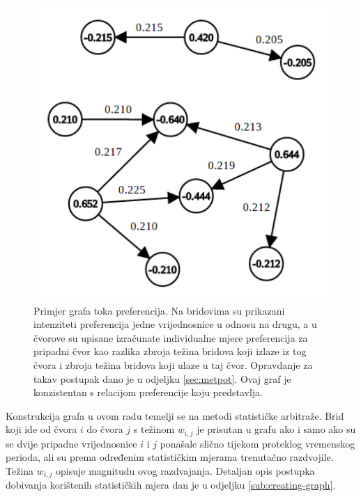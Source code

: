 \documentclass[lmodern, utf8, diplomski, numeric]{fer}
\begin{document}
  \begin{figure}[h]
    \centering
    \includegraphics[width=0.65\columnwidth]{graphics/graph.pdf}
    \caption{Primjer grafa toka preferencija. Na bridovima su prikazani intenziteti preferencija jedne vrijednosnice u odnosu na drugu, a u čvorove su upisane izračunate individualne mjere preferencija za pripadni čvor kao razlika zbroja težina bridova koji izlaze iz tog čvora i zbroja težina bridova koji ulaze u taj čvor. Opravdanje za takav postupak dano je u odjeljku \ref{sec:metpot}. Ovaj graf je konzistentan s relacijom preferencije koju predstavlja.}
    \label{fig:graph}
  \end{figure}
  
  
  Konstrukcija grafa u ovom radu temelji se na metodi statističke arbitraže.
  Brid koji ide od čvora $i$ do čvora $j$ s težinom $w_{i,j}$ je prisutan u grafu ako i samo ako su se dvije pripadne vrijednosnice $i$ i $j$ ponašale slično tijekom proteklog vremenskog perioda, ali su prema određenim statističkim mjerama trenutačno razdvojile.
  Težina $w_{i,j}$ opisuje magnitudu ovog razdvajanja.
  Detaljan opis postupka dobivanja korištenih statističkih mjera dan je u odjeljku \ref{sub:creating-graph}.
    
\end{document}
